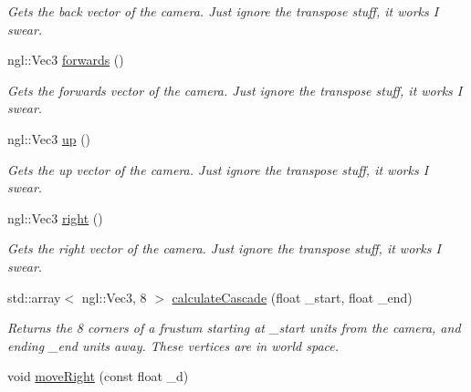 \begin{DoxyCompactItemize}
\begin{DoxyCompactList}\small\item\em Gets the back vector of the camera. Just ignore the transpose stuff, it works I swear. \end{DoxyCompactList}\item 
\hypertarget{class_camera_a838f222ce4a26cb9dfce763c8b87d475}{}ngl\+::\+Vec3 \hyperlink{class_camera_a838f222ce4a26cb9dfce763c8b87d475}{forwards} ()\label{class_camera_a838f222ce4a26cb9dfce763c8b87d475}

\begin{DoxyCompactList}\small\item\em Gets the forwards vector of the camera. Just ignore the transpose stuff, it works I swear. \end{DoxyCompactList}\item 
\hypertarget{class_camera_a1aad741f1aa633a990a392229979787e}{}ngl\+::\+Vec3 \hyperlink{class_camera_a1aad741f1aa633a990a392229979787e}{up} ()\label{class_camera_a1aad741f1aa633a990a392229979787e}

\begin{DoxyCompactList}\small\item\em Gets the up vector of the camera. Just ignore the transpose stuff, it works I swear. \end{DoxyCompactList}\item 
\hypertarget{class_camera_a9e6e1b08034dfa59780678b01d0f7c3e}{}ngl\+::\+Vec3 \hyperlink{class_camera_a9e6e1b08034dfa59780678b01d0f7c3e}{right} ()\label{class_camera_a9e6e1b08034dfa59780678b01d0f7c3e}

\begin{DoxyCompactList}\small\item\em Gets the right vector of the camera. Just ignore the transpose stuff, it works I swear. \end{DoxyCompactList}\item 
\hypertarget{class_camera_afb43b49132b3a721de58e851a6ee4600}{}std\+::array$<$ ngl\+::\+Vec3, 8 $>$ \hyperlink{class_camera_afb43b49132b3a721de58e851a6ee4600}{calculate\+Cascade} (float \+\_\+start, float \+\_\+end)\label{class_camera_afb43b49132b3a721de58e851a6ee4600}

\begin{DoxyCompactList}\small\item\em Returns the 8 corners of a frustum starting at \+\_\+start units from the camera, and ending \+\_\+end units away. These vertices are in world space. \end{DoxyCompactList}\item 
\hypertarget{class_camera_afbbb8430f2b3962d7f08d0e865a06838}{}void \hyperlink{class_camera_afbbb8430f2b3962d7f08d0e865a06838}{move\+Right} (const float \+\_\+d)\label{class_camera_afbbb8430f2b3962d7f08d0e865a06838}


\end{DoxyCompactItemize}
